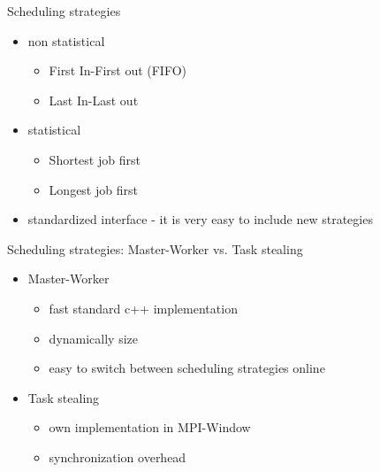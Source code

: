 	\begin{frame}{Scheduling strategies}
		\begin{itemize}
		\item non statistical
		\begin{itemize}
			\item First In-First out (FIFO)
			\item Last In-Last out
		\end{itemize}
		\item statistical
		\begin{itemize}
			\item Shortest job first
			\item Longest job first
		\end{itemize}
		\item standardized interface - it is very easy to include new strategies
		\end{itemize}
	\end{frame}
	\begin{frame}{Scheduling strategies: Master-Worker vs. Task stealing}
		\begin{itemize}
			\item Master-Worker
				\begin{itemize}
					\item fast standard c++ implementation
					\item dynamically size
					\item easy to switch between scheduling strategies online					
				\end{itemize}
			
			\item Task stealing
					\begin{itemize}
						\item own implementation in MPI-Window
						\item synchronization overhead
					\end{itemize}
			
		\end{itemize}
	\end{frame}